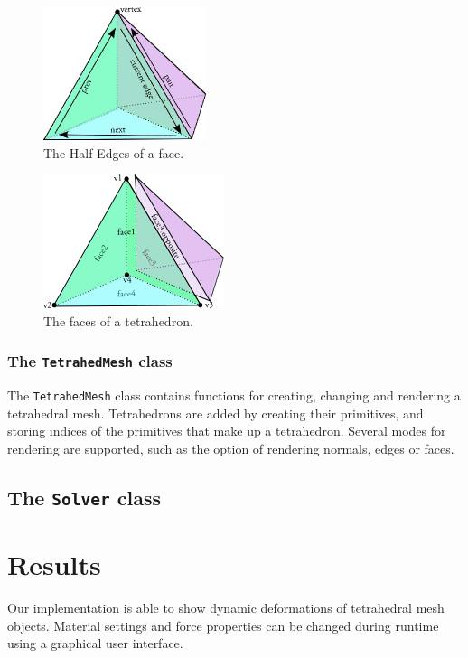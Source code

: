\documentclass[10pt,a4paper]{article}
\begin{document}
\begin{figure}[htbp]
\label{fig:tetraedge}
\begin{center}
\includegraphics[scale=1]{figures/tetra_edge}
\caption{The Half Edges of a face.}
\end{center}
\end{figure}

\begin{figure}[htbp]
\label{fig:tetraface}
\begin{center}
\includegraphics[scale=1]{figures/tetra_face}
\caption{The faces of a tetrahedron.}
\end{center}
\end{figure}


\subsubsection{The \texttt{TetrahedMesh} class}
The \texttt{TetrahedMesh} class contains functions for creating, changing and rendering a tetrahedral mesh. Tetrahedrons are added by creating their primitives, and storing indices of the primitives that make up a tetrahedron. Several modes for rendering are supported, such as the option of rendering normals, edges or faces.

\subsection{The \texttt{Solver} class}



\section{Results}
Our implementation is able to show dynamic deformations of tetrahedral mesh objects. Material settings and force properties can be changed during runtime using a graphical user interface.
\end{document}
